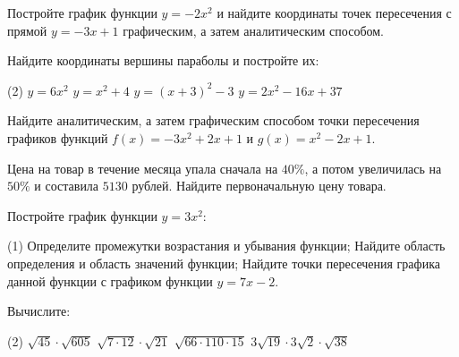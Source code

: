 \begin{class}[number=4]
	\begin{listofex}
		\item Постройте график функции \( y=-2x^2 \) и найдите координаты точек пересечения с прямой \( y=-3x+1 \) графическим, а затем аналитическим способом.
		\item Найдите координаты вершины параболы и постройте их:
		\begin{tasks}(2)
			\task \( y=6x^2 \)
			\task \( y=x^2+4 \)
			\task \( y=(x+3)^2-3 \)
			\task \( y=2x^2-16x+37 \)
		\end{tasks}
		\item Найдите аналитическим, а затем графическим способом точки пересечения графиков функций \(f(x)=-3x^2+2x+1\)	и \( g(x)=x^2-2x+1 \).
		\item Цена на товар в течение месяца упала сначала на \( 40\% \), а потом увеличилась на \( 50\% \) и составила \( 5130  \) рублей. Найдите первоначальную цену товара.
	\end{listofex}
\end{class}

\begin{homework}[number=2]
	\begin{listofex}
		\item Постройте график функции \( y=3x^2 \):
		\begin{tasks}(1)
			\task Определите промежутки возрастания и убывания функции;
			\task Найдите область определения и область значений функции;
			\task Найдите точки пересечения графика данной функции с графиком функции \( y=7x-2 \).
		\end{tasks}
		\item Вычислите: 
		\begin{tasks}(2)
			\task \( \sqrt{45}\cdot\sqrt{605} \)
			\task \( \sqrt{7\cdot12}\cdot\sqrt{21} \)
			\task \( \sqrt{66\cdot110\cdot15} \)
			\task \( 3\sqrt{19}\cdot3\sqrt{2}\cdot\sqrt{38} \)
		\end{tasks}
		\item \exercise{1422}
	\end{listofex}
\end{homework}

